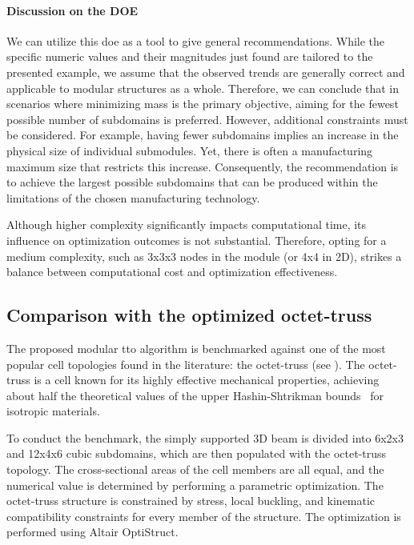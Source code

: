 \paragraph{Discussion on the DOE}
We can utilize this \gls{doe} as a tool to give general recommendations. While the specific numeric values and their magnitudes just found are tailored to the presented example, we assume that the observed trends are generally correct and applicable to modular structures as a whole. Therefore, we can conclude that in scenarios where minimizing mass is the primary objective, aiming for the fewest possible number of subdomains is preferred. However, additional constraints must be considered. For example, having fewer subdomains implies an increase in the physical size of individual submodules. Yet, there is often a manufacturing maximum size that restricts this increase. Consequently, the recommendation is to achieve the largest possible subdomains that can be produced within the limitations of the chosen manufacturing technology.

Although higher complexity significantly impacts computational time, its influence on optimization outcomes is not substantial. Therefore, opting for a medium complexity, such as 3x3x3 nodes in the module (or 4x4 in 2D), strikes a balance between computational cost and optimization effectiveness.

\subsection{Comparison with the optimized octet-truss}
The proposed modular \gls{tto} algorithm is benchmarked against one of the most popular cell topologies found in the literature: the octet-truss (see ). The octet-truss is a cell known for its highly effective mechanical properties, achieving about half the theoretical values of the upper Hashin-Shtrikman bounds~ for isotropic materials.

To conduct the benchmark, the simply supported 3D beam is divided into 6x2x3 and 12x4x6 cubic subdomains, which are then populated with the octet-truss topology. The cross-sectional areas of the cell members are all equal, and the numerical value is determined by performing a parametric optimization. The octet-truss structure is constrained by stress, local buckling, and kinematic compatibility constraints for every member of the structure. The optimization is performed using Altair OptiStruct.


